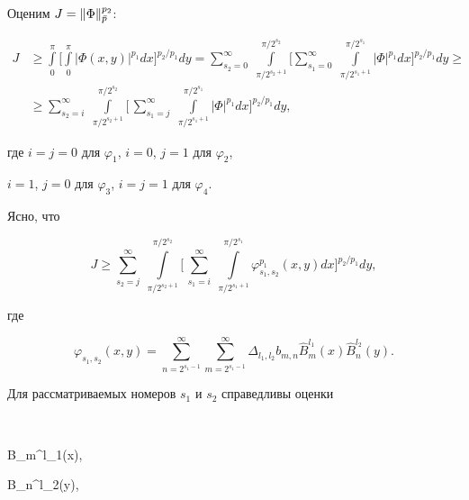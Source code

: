  


Оценим $J=\|\Phi\|^{p_2}_{\Bar p}$: 


\begin{align*} 


J&\ge \int\limits_0^\pi\biggl[\int\limits_0^\pi|\Phi(x,y)|^{p_1}dx


\biggr]^{p_2/p_1}dy 


=\sum^\infty_{s_2=0}\;\int\limits^{\pi/2^{s_2}}_{\pi/2^{s_2+1}}\biggl[ 


\sum^\infty_{s_1=0}\;\int\limits^{\pi/2^{s_1}}_{\pi/2^{s_1+1}} 


|\Phi|^{p_1}dx\biggr]^{p_2/p_1}dy \ge \\ 


% 


& \ge\sum^\infty_{s_2=i}\;\int\limits^{\pi/2^{s_2}}_{\pi/2^{s_2+1}}\biggl[\, 


\sum^\infty_{s_1=j}\;\int\limits^{\pi/2^{s_1}}_{\pi/2^{s_1+1}} 


|\Phi|^{p_1}dx\biggr]^{p_2/p_1}dy, 


\end{align*} 


где $i=j=0$ для $\varphi_1$, $i=0$, $j=1$ для $\varphi_2$, 


$i=1$, $j=0$ для $\varphi_3$, $i=j=1$ для $\varphi_4$. 


 


Ясно, что 


$$ 


J\ge \sum^\infty_{s_2=j}\;\int\limits^{\pi/2^{s_2}}_{\pi/2^{s_2+1}}\biggl[\, 


\sum^\infty_{s_1=i}\;\int\limits^{\pi/2^{s_1}}_{\pi/2^{s_1+1}} 


\varphi^{p_1}_{s_1,s_2}(x,y)dx\biggr]^{p_2/p_1}dy, 


$$ 


где 


$$ 


\varphi_{s_1,s_2}(x,y)=\sum^\infty_{n=2^{s_1-1}}\sum^\infty_{m=2^{s_1-1}} 


\Delta_{l_1,l_2}b_{m,n}\widehat B_m^{l_1}(x)\widehat B_n^{l_2}(y). 


$$ 


Для рассматриваемых номеров $s_1$ и $s_2$ справедливы оценки 


$$ 


\widehat B_m^{l_1}(x)\le{},\qquad 


\widehat B_n^{l_2}(y)\le{}, 


